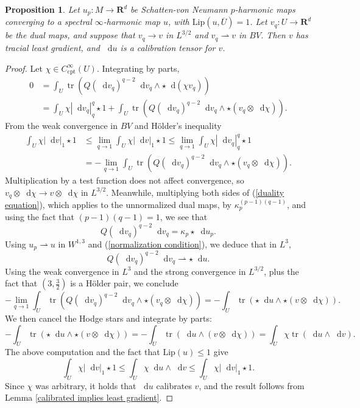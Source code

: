 \documentclass[reqno,11pt]{amsart}
\newcommand{\RR}{\mathbf{R}}
\newcommand*\dif{\mathop{}\!\mathrm{d}}
\DeclareMathOperator{\tr}{tr}
\newcommand{\Lip}{\mathrm{Lip}}
\newcommand{\cpt}{\mathrm{cpt}}
\newtheorem{proposition}[theorem]{Proposition}
\newcommand{\weakto}{\rightharpoonup}
\theoremstyle{definition}
\numberwithin{equation}{section}
\begin{document}
\begin{proposition}\label{constructing the dual map}
Let $u_p: M \to \RR^d$ be Schatten-von Neumann $p$-harmonic maps converging to a spectral $\infty$-harmonic map $u$, with $\Lip(u, \overline U) = 1$.
Let $v_q: U \to \RR^d$ be the dual maps, and suppose that $v_q \to v$ in $L^{3/2}$ and $v_q \weakto v$ in $BV$.
Then $v$ has tracial least gradient, and $\dif u$ is a calibration tensor for $v$.
\end{proposition}
\begin{proof}
Let $\chi \in C^\infty_\cpt(U)$.
Integrating by parts,
\begin{align*}
0 &= \int_U \tr(Q(\dif v_q)^{q - 2} \dif v_q \wedge \star \dif (\chi v_q)) \\
&= \int_U \chi|\dif v_q|_{q}^q \star 1 + \int_U \tr(Q(\dif v_q)^{q - 2} \dif v_q \wedge \star (v_q \otimes \dif \chi)).
\end{align*}
From the weak convergence in $BV$ and H\"older's inequality
\begin{align*}
\int_U \chi|\dif v|_{1} \star 1
&\leq \lim_{q \to 1} \int_U \chi |\dif v|_1 \star 1 
\leq \lim_{q \to 1} \int_U \chi|\dif v_q|_q^q \star 1 \\
&= -\lim_{q \to 1} \int_U \tr(Q(\dif v_q)^{q - 2} \dif v_q \wedge \star (v_q \otimes \dif \chi)).
\end{align*}
Multiplication by a test function does not affect convergence, so $v_q \otimes \dif \chi \to v \otimes \dif \chi$ in $L^{3/2}$.
Meanwhile, multiplying both sides of (\ref{duality equation}), which applies to the unnormalized dual maps, by $\kappa_p^{(p - 1)(q - 1)}$, and using the fact that $(p - 1)(q - 1) = 1$, we see that 
$$Q(\dif v_q)^{q - 2} \dif v_q = \kappa_p \star \dif u_p.$$
Using $u_p \weakto u$ in $W^{1, 3}$ and (\ref{normalization condition}), we deduce that in $L^3$,
$$Q(\dif v_q)^{q - 2} \dif v_q \weakto \star \dif u.$$
Using the weak convergence in $L^3$ and the strong convergence in $L^{3/2}$, plus the fact that $(3, \frac{3}{2})$ is a H\"older pair, we conclude
$$-\lim_{q \to 1} \int_U \tr(Q(\dif v_q)^{q - 2} \dif v_q \wedge \star (v_q \otimes \dif \chi)) = -\int_U \tr(\star \dif u \wedge \star (v \otimes \dif \chi)).$$
We then cancel the Hodge stars and integrate by parts:
$$-\int_U \tr(\star \dif u \wedge \star (v \otimes \dif \chi)) = -\int_U \tr(\dif u \wedge (v \otimes \dif \chi)) = \int_U \chi \tr(\dif u \wedge \dif v).$$
The above computation and the fact that $\Lip(u) \leq 1$ give
$$\int_U \chi|\dif v|_{1} \star 1 \leq \int_U \chi\dif u \wedge \dif v \leq \int_U \chi|\dif v|_{1} \star 1.$$
Since $\chi$ was arbitrary, it holds that $\dif u$ calibrates $v$, and the result follows from Lemma \ref{calibrated implies least gradient}.
\end{proof}
\end{document}

